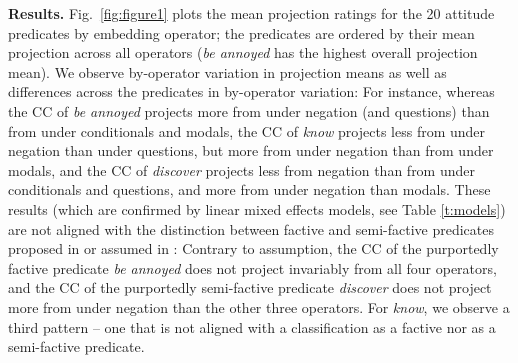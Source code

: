 \documentclass[12pt, a4paper]{article}
\begin{document}




\noindent
{\bf Results.} Fig.~\ref{fig:figure1} plots the mean projection ratings for the 20 attitude predicates by embedding operator; the predicates are ordered by their mean projection across all operators (\emph{be annoyed} has the highest overall projection mean). We observe by-operator variation in projection means as well as differences across the predicates in by-operator variation: For instance, whereas the CC of \emph{be annoyed} projects more from under negation (and questions) than from under conditionals and modals, the CC of \emph{know} projects less from under negation than under questions, but more from under negation than from under modals, and the CC of \emph{discover} projects less from negation than from under conditionals and questions, and more from under negation than modals. These results (which are confirmed by linear mixed effects models, see Table \ref{t:models}) are not aligned with the distinction between factive and semi-factive predicates proposed in \citealt{karttunen_observations_1971} or assumed in \citealt{djarv_cognitive_2018}: Contrary to assumption, the CC of the purportedly factive predicate \emph{be annoyed} does not project invariably from all four operators, and the CC of the purportedly semi-factive predicate \emph{discover} does not project more from under negation than the other three operators. For {\em know}, we observe a third pattern -- one that is not aligned with a classification as a factive nor as a semi-factive predicate. 
\end{document}
